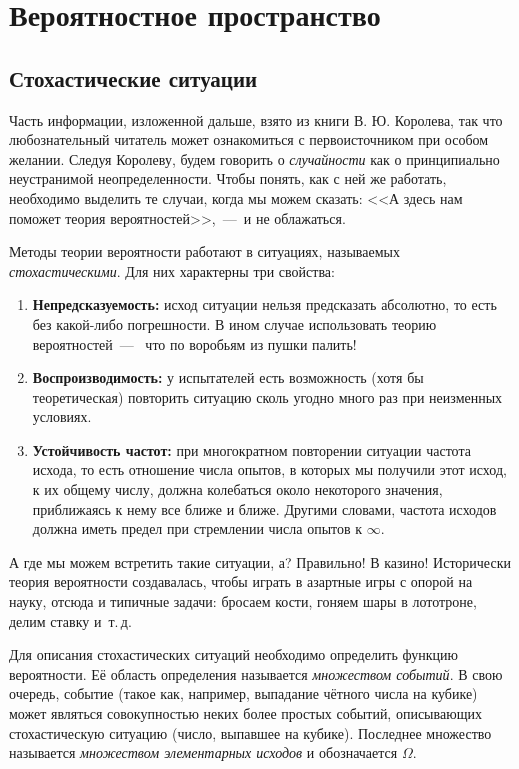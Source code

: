 \documentclass[../TV&MS.tex]{subfiles}
\begin{document}
\section{Вероятностное пространство}

\subsection{Стохастические ситуации}

\qquad Часть информации, изложенной дальше, взято из книги \cite{Korolev} В. Ю. Королева, 
так что любознательный читатель может ознакомиться с первоисточником при особом желании.
Следуя Королеву, будем говорить о \textit{случайности} как о принципиально
неустранимой неопределенности. Чтобы понять, как с ней же работать, необходимо
выделить те случаи, когда мы можем сказать: <<А здесь нам поможет теория вероятностей>>,~---~и не облажаться.

Методы теории вероятности работают в ситуациях, называемых \textit{стохастическими}. 
Для них характерны три свойства:
\begin{enumerate}[label={\bfseries \ding{118}\quad\arabic{enumi}:},leftmargin=*]
	\item \textbf{Непредсказуемость:} исход ситуации нельзя предсказать абсолютно, то
	есть без какой-либо погрешности. В ином случае использовать теорию вероятностей~---~ 
	что по воробьям из пушки палить!
	
	\item \textbf{Воспроизводимость:} у испытателей есть возможность (хотя бы теоретическая) 
	повторить ситуацию сколь угодно много раз при неизменных условиях.
	
	\item \textbf{Устойчивость частот:} при многократном повторении ситуации частота исхода,
	то есть отношение числа опытов, в которых мы получили этот исход, к их общему числу,
	должна колебаться около некоторого значения, приближаясь к нему все ближе и ближе.
	Другими словами, частота исходов должна иметь предел при стремлении
	числа опытов к $\infty$.
\end{enumerate}

А где мы можем встретить такие ситуации, а? Правильно! В казино!
Исторически теория вероятности создавалась, чтобы играть в азартные игры с опорой на науку, 
отсюда и типичные задачи: бросаем кости, гоняем шары в лототроне, делим ставку и~т.\,д.

Для описания стохастических ситуаций необходимо определить функцию вероятности. 
Её область определения называется \textit{множеством событий}. В свою очередь, событие 
(такое как, например, выпадание чётного числа на кубике) может являться совокупностью неких 
более простых событий, описывающих стохастическую ситуацию (число, выпавшее на кубике). 
Последнее множество называется \textit{множеством элементарных исходов} и обозначается $\Omega$.  
\end{document}
